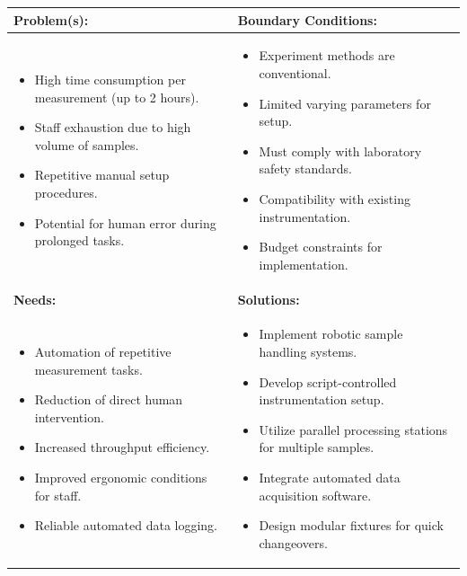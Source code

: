 \documentclass{article}
\begin{document}
\begin{table}[h!]
\centering
\renewcommand{\arraystretch}{1.5}
\begin{tabularx}{\textwidth}{|X|X|}
\hline
\textbf{Problem(s):} & \textbf{Boundary Conditions:} \\ \hline
\begin{itemize}
    \item High time consumption per measurement (up to 2 hours).
    \item Staff exhaustion due to high volume of samples.
    \item Repetitive manual setup procedures.
    \item Potential for human error during prolonged tasks.
\end{itemize} & 
\begin{itemize}
    \item Experiment methods are conventional.
    \item Limited varying parameters for setup.
    \item Must comply with laboratory safety standards.
    \item Compatibility with existing instrumentation.
    \item Budget constraints for implementation.
\end{itemize} \\ \hline
\textbf{Needs:} & \textbf{Solutions:} \\ \hline
\begin{itemize}
    \item Automation of repetitive measurement tasks.
    \item Reduction of direct human intervention.
    \item Increased throughput efficiency.
    \item Improved ergonomic conditions for staff.
    \item Reliable automated data logging.
\end{itemize} & 
\begin{itemize}
    \item Implement robotic sample handling systems.
    \item Develop script-controlled instrumentation setup.
    \item Utilize parallel processing stations for multiple samples.
    \item Integrate automated data acquisition software.
    \item Design modular fixtures for quick changeovers.

\end{itemize}
\end{tabularx}
\end{table}
\end{document}
